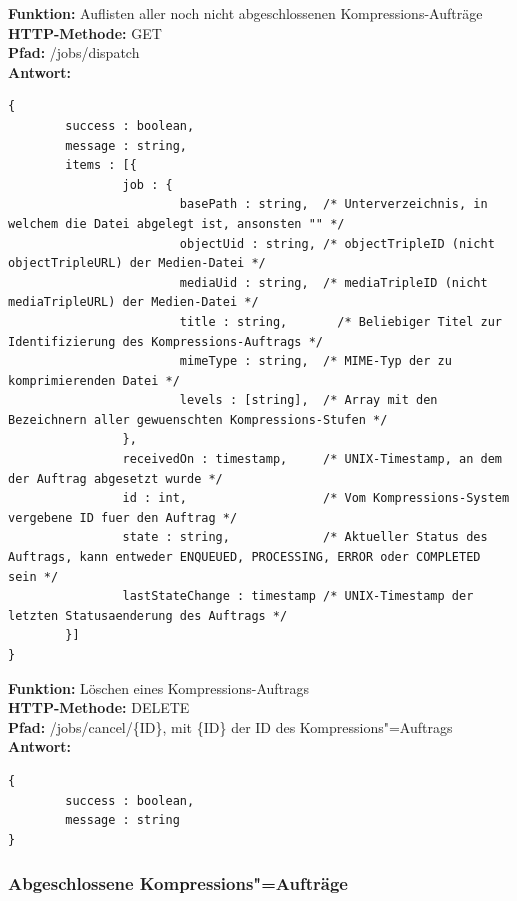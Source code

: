 \noindent\textbf{Funktion: }Auflisten aller noch nicht abgeschlossenen Kompressions-Aufträge\\
\textbf{HTTP-Methode: } {\ttfamily GET} \\
\textbf{Pfad: } {\ttfamily /jobs/dispatch} \\
\textbf{Antwort: }
\begin{lstlisting}[caption={Antwort auf das Auflisten nicht abgeschlossener Kompressions-Aufträge}]
{
		success : boolean,
		message : string,
		items : [{
				job : {
						basePath : string, 	/* Unterverzeichnis, in welchem die Datei abgelegt ist, ansonsten "" */
						objectUid : string, /* objectTripleID (nicht objectTripleURL) der Medien-Datei */
						mediaUid : string, 	/* mediaTripleID (nicht mediaTripleURL) der Medien-Datei */
						title : string, 	  /* Beliebiger Titel zur Identifizierung des Kompressions-Auftrags */
						mimeType : string, 	/* MIME-Typ der zu komprimierenden Datei */
						levels : [string], 	/* Array mit den Bezeichnern aller gewuenschten Kompressions-Stufen */
				},
				receivedOn : timestamp,     /* UNIX-Timestamp, an dem der Auftrag abgesetzt wurde */
				id : int,                   /* Vom Kompressions-System vergebene ID fuer den Auftrag */
				state : string,             /* Aktueller Status des Auftrags, kann entweder ENQUEUED, PROCESSING, ERROR oder COMPLETED sein */
				lastStateChange : timestamp /* UNIX-Timestamp der letzten Statusaenderung des Auftrags */
		}]
}
\end{lstlisting}

\noindent\textbf{Funktion: }Löschen eines Kompressions-Auftrags\\
\textbf{HTTP-Methode: } {\ttfamily DELETE} \\
\textbf{Pfad: } {\ttfamily /jobs/cancel/\{ID\}}, mit \{ID\} der ID des Kompressions"=Auftrags \\
\textbf{Antwort: }
\begin{lstlisting}[caption={Antwort auf das Löschen eines Kompressions-Auftrags}]
{
		success : boolean,
		message : string
}
\end{lstlisting}

\subsubsection{Abgeschlossene Kompressions"=Aufträge}


